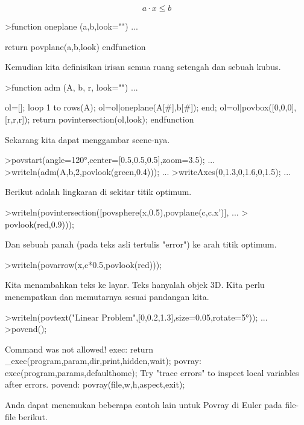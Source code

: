 \documentclass[a4paper,10pt]{article}
\begin{document}
\begin{eulernotebook}
\begin{eulercomment}
\end{eulercomment}
\begin{eulerformula}
\[
a \cdot x \le b
\]
\end{eulerformula}
\begin{eulerprompt}
>function oneplane (a,b,look="") ...
\end{eulerprompt}
\begin{eulerudf}
    return povplane(a,b,look)
  endfunction
\end{eulerudf}
\begin{eulercomment}
Kemudian kita definisikan irisan semua ruang setengah dan sebuah kubus.
\end{eulercomment}
\begin{eulerprompt}
>function adm (A, b, r, look="") ...
\end{eulerprompt}
\begin{eulerudf}
    ol=[];
    loop 1 to rows(A); ol=ol|oneplane(A[#],b[#]); end;
    ol=ol|povbox([0,0,0],[r,r,r]);
    return povintersection(ol,look);
  endfunction
\end{eulerudf}
\begin{eulercomment}
Sekarang kita dapat menggambar scene-nya.
\end{eulercomment}
\begin{eulerprompt}
>povstart(angle=120°,center=[0.5,0.5,0.5],zoom=3.5); ...
>writeln(adm(A,b,2,povlook(green,0.4))); ...
>writeAxes(0,1.3,0,1.6,0,1.5); ...
\end{eulerprompt}
\begin{eulercomment}
Berikut adalah lingkaran di sekitar titik optimum.
\end{eulercomment}
\begin{eulerprompt}
>writeln(povintersection([povsphere(x,0.5),povplane(c,c.x')], ...
>  povlook(red,0.9)));
\end{eulerprompt}
\begin{eulercomment}
Dan sebuah panah (pada teks asli tertulis "error") ke arah titik optimum.
\end{eulercomment}
\begin{eulerprompt}
>writeln(povarrow(x,c*0.5,povlook(red)));
\end{eulerprompt}
\begin{eulercomment}
Kita menambahkan teks ke layar. Teks hanyalah objek 3D. Kita perlu menempatkan dan memutarnya sesuai pandangan kita.
\end{eulercomment}
\begin{eulerprompt}
>writeln(povtext("Linear Problem",[0,0.2,1.3],size=0.05,rotate=5°)); ...
>povend();
\end{eulerprompt}
\begin{euleroutput}
  Command was not allowed!
  exec:
      return _exec(program,param,dir,print,hidden,wait);
  povray:
      exec(program,params,defaulthome);
  Try "trace errors" to inspect local variables after errors.
  povend:
      povray(file,w,h,aspect,exit); 
\end{euleroutput}
\begin{eulercomment}
Anda dapat menemukan beberapa contoh lain untuk Povray di Euler pada
file-file berikut.


\end{eulercomment}
\end{eulernotebook}
\end{document}
